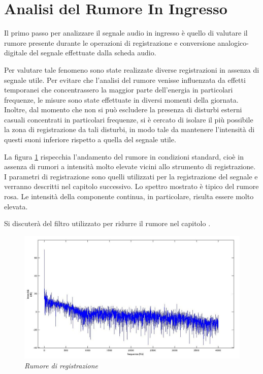 \chapter*{Analisi del Rumore In Ingresso}\label{cap:rumore}

Il primo passo per analizzare il segnale audio in ingresso è quello di valutare il rumore presente durante le operazioni di registrazione e conversione analogico-digitale del segnale effettuate dalla scheda audio. 

Per valutare tale fenomeno sono state realizzate diverse registrazioni in assenza di segnale utile. 
Per evitare che l'analisi del rumore venisse influenzata da effetti temporanei che concentrassero la maggior parte dell'energia in particolari frequenze, le misure sono state effettuate in diversi momenti della giornata.
Inoltre, dal momento che non si può escludere la presenza di disturbi esterni casuali concentrati in particolari frequenze, si è cercato di isolare il più possibile la zona di registrazione da tali disturbi, in modo tale da mantenere l'intensità di questi suoni inferiore rispetto a quella del segnale utile.
 
La figura \ref{fig:rumore} rispecchia l'andamento del rumore in condizioni standard, cioè in assenza di rumori a intensità molto elevate vicini allo strumento di registrazione. 
I parametri di registrazione sono quelli utilizzati per la registrazione del segnale e verranno descritti nel capitolo successivo.
Lo spettro mostrato è tipico del rumore rosa. 
Le intensità della componente continua, in particolare, risulta essere molto elevata.

Si discuterà del filtro utilizzato per ridurre il rumore nel capitolo .

	\begin{figure}[h]
	  \begin{center} 
	    \includegraphics[width=\textwidth*\real{0.9}]{images/ch_02/spettro_rumore.jpg}
	  \end{center} 
	  \caption{\textit{Rumore di registrazione}}  
	  \label{fig:rumore}
	\end{figure}



